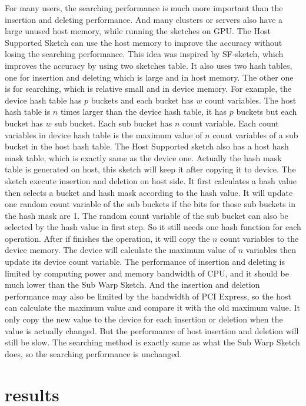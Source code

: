 \documentclass[conference]{IEEEtran}
\begin{document}
For many users, the searching performance is much more important than the insertion and deleting performance. And many clusters or servers also have a large unused host memory, while running the sketches on GPU.  The Host Supported Sketch can use the host memory to improve the accuracy without losing the searching performance. This idea was inspired by SF-sketch\cite{b3}, which improves the accuracy by using two sketches table. It also uses two hash tables, one for insertion and deleting which is large and in host memory. The other one is for searching, which is relative small and in device memory.
For example, the device hash table has $p$ buckets and each bucket has $w$ count variables. The host hash table is $n$ times larger than the device hash table, it has $p$ buckets but each bucket has $w$ sub bucket. Each sub bucket has $n$ count variable. Each count variables in device hash table is the maximum value of $n$ count variables of a sub bucket in the host hash table. The Host Supported sketch also has a host hash mask table, which is exactly same as the device one. Actually the hash mask table is generated on host, this sketch will keep it after copying it to device.
The sketch execute insertion and deletion on host side. It first calculates a hash value then selects a bucket and hash mask according to the hash value. It will update one random count variable of the sub buckets if the bits for those sub buckets in the hash mask are 1. The random count variable of the sub bucket can also be selected by the hash value in first step. So it still needs one hash function for each operation. After if finishes the operation, it will copy the $n$ count variables to the device memory. The device will calculate the maximum value of $n$ variables then update its device count variable. The performance of insertion and deleting is limited by computing power and memory bandwidth of CPU, and it should be much lower than the Sub Warp Sketch. And the insertion and deletion performance may also be limited by the bandwidth of PCI Express, so the host can calculate the maximum value and compare it with the old maximum value. It only copy the new value to the device for each insertion or deletion when the value is actually changed. But the performance of host insertion and deletion will still be slow.
The searching method is exactly same as what the Sub Warp Sketch does, so the searching performance is unchanged.
\section{results}
\end{document}
